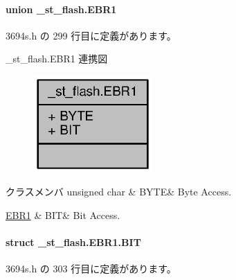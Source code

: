 \paragraph{union \+\_\+st\+\_\+flash.\+E\+B\+R1}


 3694s.\+h の 299 行目に定義があります。



\+\_\+st\+\_\+flash.\+E\+B\+R1 連携図
\nopagebreak
\begin{figure}[H]
\begin{center}
\leavevmode
\includegraphics[width=129pt]{d9/df1/union__st__flash_8EBR1__coll__graph}
\end{center}
\end{figure}
\begin{DoxyFields}{クラスメンバ}
unsigned char\label{3694s_8h_ae409eb2ba6eb6801f52763ae370c350e}
&
B\+Y\+T\+E&
Byte Access. \\
\hline

\hyperlink{3694s_8h_d7/d39/struct__st__flash_8EBR1_8BIT}{E\+B\+R1}\label{3694s_8h_adb957fdc8000e1eef04a243f5199aa52}
&
B\+I\+T&
Bit Access. \\
\hline

\end{DoxyFields}
\label{struct__st__flash_8EBR1_8BIT}
\paragraph{struct \+\_\+st\+\_\+flash.\+E\+B\+R1.\+B\+I\+T}


 3694s.\+h の 303 行目に定義があります。



